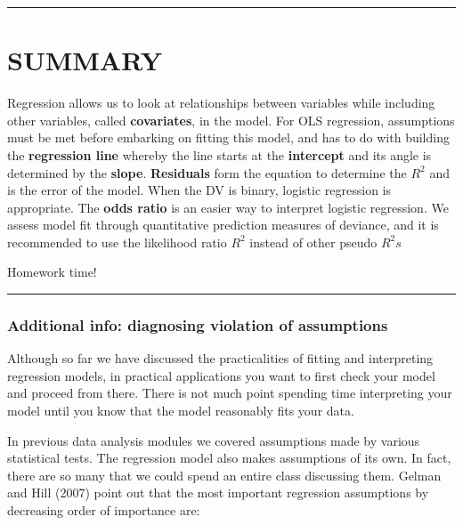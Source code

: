 \documentclass[
]{book}
\begin{document}
\begin{center}\rule{0.5\linewidth}{0.5pt}\end{center}

\hypertarget{summary-8}{%
\section{SUMMARY}\label{summary-8}}

Regression allows us to look at relationships between variables while including other variables, called \textbf{covariates}, in the model. For OLS regression, assumptions must be met before embarking on fitting this model, and has to do with building the \textbf{regression line} whereby the line starts at the \textbf{intercept} and its angle is determined by the \textbf{slope}. \textbf{Residuals} form the equation to determine the \(R^2\) and is the error of the model. When the DV is binary, logistic regression is appropriate. The \textbf{odds ratio} is an easier way to interpret logistic regression. We assess model fit through quantitative prediction measures of deviance, and it is recommended to use the likelihood ratio \(R^2\) instead of other pseudo \(R^2s\)

Homework time!

\begin{center}\rule{0.5\linewidth}{0.5pt}\end{center}

\hypertarget{additional-info-diagnosing-violation-of-assumptions}{%
\subsubsection{Additional info: diagnosing violation of assumptions}\label{additional-info-diagnosing-violation-of-assumptions}}

Although so far we have discussed the practicalities of fitting and interpreting regression models, in practical applications you want to first check your model and proceed from there. There is not much point spending time interpreting your model until you know that the model reasonably fits your data.

In previous data analysis modules we covered assumptions made by various statistical tests. The regression model also makes assumptions of its own. In fact, there are so many that we could spend an entire class discussing them. Gelman and Hill (2007) point out that the most important regression assumptions by decreasing order of importance are:
\end{document}
